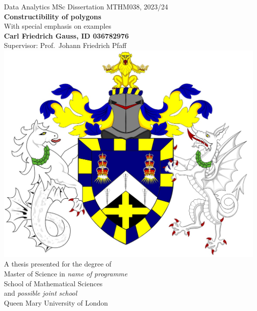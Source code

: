 \documentclass[12pt, oneside]{book}
\theoremstyle{plain}
\theoremstyle{definition}
\begin{document}
\begin{titlepage}
\begin{center}
        \vspace{-2cm}
Data Analytics MSc Dissertation MTHM038, 2023/24
		\\
        \Huge
        \textbf{Constructibility of polygons}
        \\        
        \vspace{0.4cm}
        \LARGE
        With special emphasis on examples
        \\        
        \vspace{0.4cm}        
        \textbf{Carl Friedrich Gauss, ID 036782976}%
        \\
        \large Supervisor: Prof.\ Johann Friedrich Pfaff
        \\
        \vspace{0.9cm}
        \includegraphics[scale=0.3]{QMCrest.jpg}
        \\
        \vspace{0.9cm}        
        \LARGE 
        A thesis presented for the degree of\\
        Master of Science in \emph{name of programme}\\
        \vspace{0.7cm}        
        \Large
        School of Mathematical Sciences\\ 
        and \emph{possible joint school}\\
        Queen Mary University of London \\
    \end{center}
\end{titlepage}
\end{document}
